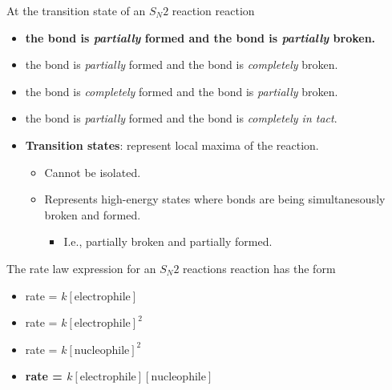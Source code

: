 \documentclass[12pt,a4paper]{article}
\begin{document}
\begin{enumerate}
\begin{itemize}
\begin{itemize}
\begin{itemize}
                    \end{itemize}
            \end{itemize}
    \end{itemize}
    {\color{G-Moon}\item At the transition state of an \(S_N2\) reaction reaction
    \begin{itemize}
        \item {\color{o-Sun}\textbf{the  bond is \textit{partially} formed and the  bond is \textit{partially} broken.}}
        \item the  bond is \textit{partially} formed and the  bond is \textit{completely} broken.
        \item the  bond is \textit{completely} formed and the  bond is \textit{partially} broken.
        \item the  bond is \textit{partially} formed and the  bond is \textit{completely in tact}.
    \end{itemize}
    }
    \begin{itemize}
        \item \textbf{Transition states}: represent local maxima of the reaction.
        \begin{itemize}
            \item Cannot be isolated.
            \item Represents high-energy states where bonds are being simultanesously broken and formed.
                \begin{itemize}
                    \item I.e., partially broken and partially formed.
                \end{itemize}
        \end{itemize}
    \end{itemize}
    {\color{G-Moon}\item The rate law expression for an \(S_N2\) reactions reaction has the form
    \begin{itemize}
        \item rate = \(k[\text{electrophile}]\)
        \item rate = \(k[\text{electrophile}]^2\)
        \item rate = \(k[\text{nucleophile}]^2\)
        \item {\color{o-Sun}\textbf{rate = \(k[\text{electrophile}][\text{nucleophile}]\)}}
    \end{itemize}
    }
    \begin{itemize}

\end{itemize}
\end{enumerate}
\end{document}
